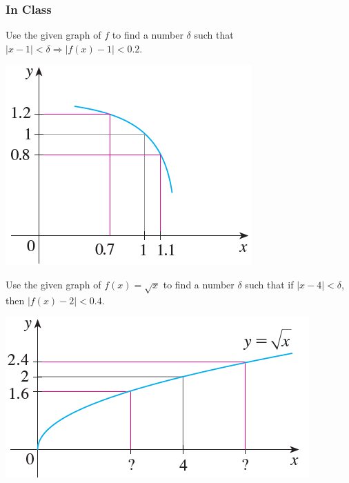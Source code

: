 \documentclass[notes]{subfiles}
\begin{document}
	\subsubsection*{In Class}
		\begin{ex}
			Use the given graph of $f$ to find a number $\delta$ such that $|x - 1| < \delta\Rightarrow |f(x) - 1| < 0.2$.
			\begin{flushleft}
				\includegraphics{1.7fig1}
			\end{flushleft}
		\end{ex}
			\newpage
			
		\begin{ex}
			Use the given graph of $f(x) = \sqrt{x}$ to find a number $\delta$ such that if $|x - 4| < \delta$, then $|f(x) - 2 | < 0.4$.	
			\begin{flushleft}
				\includegraphics{1.7fig2}
			\end{flushleft}
		\end{ex}
			
\end{document}
